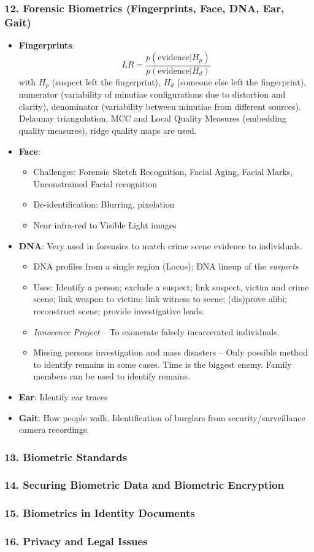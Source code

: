 \documentclass[a4paper]{article}
\begin{document}
    \subsubsection*{12. Forensic Biometrics (Fingerprints, Face, DNA, Ear, Gait)}
      \begin{itemize}
        \item \textbf{Fingerprints}: $$LR = \frac{p(\text{evidence}|H_p)}{p(\text{evidence}|H_d)}$$
        with $H_p$ (suspect left the fingerprint), $H_d$ (someone else left the fingerprint), numerator (variability of minutiae configurations due to distortion and clarity), denominator (variability between minutiae from different sources). Delaunay triangulation, MCC and Local Quality Measures (embedding quality measures), ridge quality maps are used.
        \item \textbf{Face}:
        \begin{itemize}
          \item Challenges: Forensic Sketch Recognition, Facial Aging, Facial Marks, Unconstrained Facial recognition
          \item De-identification: Blurring, pixelation
          \item Near infra-red to Visible Light images
        \end{itemize}
        \item \textbf{DNA}: Very used in forensics to match crime scene evidence to individuals.
        \begin{itemize}
          \item DNA profiles from a single region (Locus); DNA lineup of the \emph{suspects}
          \item Uses: Identify a person; exclude a suspect; link suspect, victim and crime scene; link weapon to victim; link witness to scene; (dis)prove alibi; reconstruct scene; provide investigative leads.
          \item \emph{Innocence Project} -- To exonerate falsely incarcerated individuals.
          \item Missing persons investigation and mass disasters -- Only possible method to identify remains in some cases. Time is the biggest enemy. Family members can be used to identify remains.
        \end{itemize}
        \item \textbf{Ear}: Identify ear traces
        \item \textbf{Gait}: How people walk. Identification of burglars from security/surveillance camera recordings.
      \end{itemize}
    \subsubsection*{13. Biometric Standards}
    \subsubsection*{14. Securing Biometric Data and Biometric Encryption}
    \subsubsection*{15. Biometrics in Identity Documents}
    \subsubsection*{16. Privacy and Legal Issues}
\end{document}
